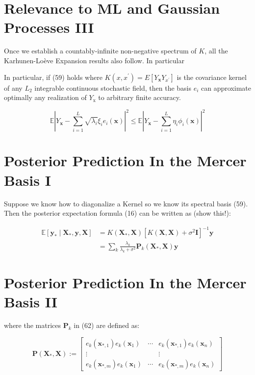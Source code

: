 \documentclass[11pt]{article}
\theoremstyle{plain} %
\theoremstyle{remark}
\begin{document}
\section*{Relevance to ML and Gaussian Processes III}
Once we establish a countably-infinite non-negative spectrum of $K$, all the
Karhunen-Loève Expansion results also follow. In particular

In particular, if (59) holds where $K\left(x,
x^{\prime}\right)=E\left[Y_{\mathbf{x}} Y_{x^{\prime}}\right]$ is the covariance
kernel of any $L_{2}$ integrable continuous stochastic field, then the basis
$e_{i}$ can approximate optimally any realization of $Y_{\mathrm{x}}$ to
arbitrary finite accuracy.

$$
\mathbb{E}\left|Y_{\mathbf{x}}-\sum_{i=1}^{L} \sqrt{\lambda_{i}} \xi_{i} e_{i}(\mathbf{x})\right|^{2} \leq \mathbb{E}\left|Y_{\mathbf{x}}-\sum_{i=1}^{L} \eta_{i} \phi_{i}(\mathbf{x})\right|^{2}
$$

\section*{Posterior Prediction In the Mercer Basis I}
Suppose we know how to diagonalize a Kernel so we know its spectral basis (59).
Then the posterior expectation formula (16) can be written as (show this!):

$$
\begin{aligned}
\mathbb{E}\left[\mathbf{y}_{*} \mid \mathbf{X}_{*}, \mathbf{y}, \mathbf{X}\right] & =K\left(\mathbf{X}_{*}, \mathbf{X}\right)\left[K(\mathbf{X}, \mathbf{X})+\sigma^{2} \mathbf{I}\right]^{-1} \mathbf{y} \\
& =\sum_{k} \frac{\lambda_{k}}{\lambda_{k}+\sigma^{2}} \mathbf{P}_{k}\left(\mathbf{X}_{*}, \mathbf{X}\right) \mathbf{y}
\end{aligned}
$$

\section*{Posterior Prediction In the Mercer Basis II}
where the matrices $\mathbf{P}_{k}$ in (62) are defined as:

$$
\mathbf{P}\left(\mathbf{X}_{*}, \mathbf{X}\right):=\left[\begin{array}{ccc}
e_{k}\left(\mathbf{x}_{*, 1}\right) e_{k}\left(\mathbf{x}_{1}\right) & \cdots & e_{k}\left(\mathbf{x}_{*, 1}\right) e_{k}\left(\mathbf{x}_{n}\right) \\
\vdots & & \vdots \\
e_{k}\left(\mathbf{x}_{*, m}\right) e_{k}\left(\mathbf{x}_{1}\right) & \cdots & e_{k}\left(\mathbf{x}_{*, m}\right) e_{k}\left(\mathbf{x}_{n}\right)
\end{array}\right]
$$
\end{document}
